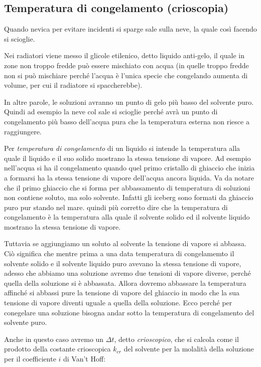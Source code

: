 \subsection{Temperatura di congelamento (crioscopia)}
Quando nevica per evitare incidenti si sparge sale sulla neve, la quale così facendo si scioglie.

Nei radiatori viene messo il glicole etilenico, detto liquido anti-gelo, il quale in zone non troppo fredde può essere mischiato con acqua (in quelle troppo fredde non si può mischiare perché l'acqua è l'unica specie che congelando aumenta di volume, per cui il radiatore si spaccherebbe).

In altre parole, le soluzioni avranno un punto di gelo più basso del solvente puro. Quindi ad esempio la neve col sale si scioglie perché avrà un punto di congelamento più basso dell'acqua pura che la temperatura esterna non riesce a raggiungere.

Per \textit{temperatura di congelamento} di un liquido si intende la temperatura alla quale il liquido e il suo solido mostrano la stessa tensione di vapore. Ad esempio nell'acqua si ha il congelamento quando quel primo cristallo di ghiaccio che inizia a formarsi ha la stessa tensione di vapore dell'acqua ancora liquida. Va da notare che il primo ghiaccio che si forma per abbassamento di temperatura di soluzioni non contiene soluto, ma solo solvente. Infatti gli iceberg sono formati da ghiaccio puro pur stando nel mare. \E quindi più corretto dire che la temperatura di congelamento è la temperatura alla quale il solvente solido ed il solvente liquido mostrano la stessa tensione di vapore.

Tuttavia se aggiungiamo un soluto al solvente la tensione di vapore si abbassa. Ciò significa che mentre prima a una data temperatura di congelamemto il solvente solido e il solvente liquido puro avevano la stessa tensione di vapore, adesso che abbiamo una soluzione avremo due tensioni di vapore diverse, perché quella della soluzione si è abbassata. Allora dovremo abbassare la temperatura affinché si abbassi pure la tensione di vapore del ghiaccio in modo che la sua tensione di vapore diventi uguale a quella della soluzione. Ecco perché per conegelare una soluzione bisogna andar sotto la temperatura di congelamento del solvente puro.

Anche in questo caso avremo un $\Delta t$, detto \textit{crioscopico}, che si calcola come il prodotto della costante crioscopica $k_{cr}$ del solvente per la molalità della soluzione per il coefficiente $i$ di Van't Hoff:

